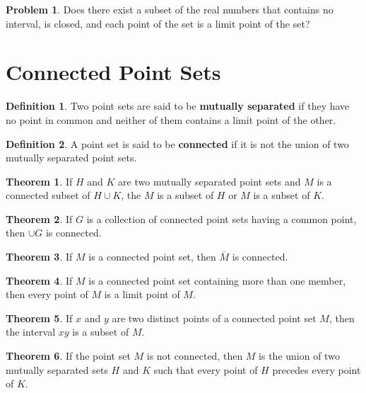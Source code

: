 \documentclass{article}
\theoremstyle{definition}
\newtheorem{definition}{Definition}
\newtheorem{theorem}{Theorem}
\theoremstyle{definition}
\newtheorem{problem}{Problem}
\theoremstyle{plain}
\begin{document}
\begin{problem}
  Does there exist a subset of the real numbers that contains no interval, is
  closed, and each point of the set is a limit point of the set?
\end{problem}

\section*{Connected Point Sets}

\begin{definition}
  Two point sets are said to be \textbf{mutually separated} if they have no
  point in common and neither of them contains a limit point of the other.
\end{definition}

\begin{definition}
  A point set is said to be \textbf{connected} if it is not the union of two
  mutually separated point sets.
\end{definition}

\begin{theorem}
  If $H$ and $K$ are two mutually separated point sets and $M$ is a connected
  subset of $H \cup K$, the $M$ is a subset of $H$ or $M$ is a subset of $K$.
\end{theorem}

\begin{theorem}
  If $G$ is a collection of connected point sets having a common point, then
  $\cup G$ is connected.
\end{theorem}

\begin{theorem}
  If $M$ is a connected point set, then $\bar{M}$ is
  connected.
\end{theorem}

\begin{theorem}
  If $M$ is a connected point set containing more than one member, then every
  point of $M$ is a limit point of $M$.
\end{theorem}

\begin{theorem}
   If $x$ and $y$ are two distinct points of a connected
  point set $M$, then the interval $xy$ is a subset of $M$.
\end{theorem}

\begin{theorem}
   If the point set $M$ is not connected, then $M$ is the
  union of two mutually separated sets $H$ and $K$ such that every point of $H$
  precedes every point of $K$.
\end{theorem}
\end{document}
